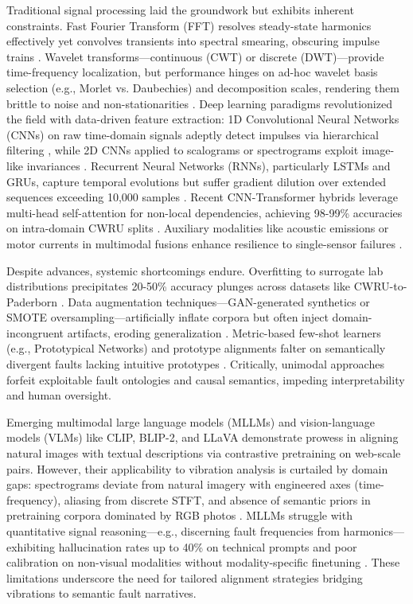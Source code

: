 Traditional signal processing laid the groundwork but exhibits inherent constraints. Fast Fourier Transform (FFT) resolves steady-state harmonics effectively yet convolves transients into spectral smearing, obscuring impulse trains \cite{cite10}. Wavelet transforms—continuous (CWT) or discrete (DWT)—provide time-frequency localization, but performance hinges on ad-hoc wavelet basis selection (e.g., Morlet vs. Daubechies) and decomposition scales, rendering them brittle to noise and non-stationarities \cite{cite11}. Deep learning paradigms revolutionized the field with data-driven feature extraction: 1D Convolutional Neural Networks (CNNs) on raw time-domain signals adeptly detect impulses via hierarchical filtering \cite{cite12}, while 2D CNNs applied to scalograms or spectrograms exploit image-like invariances \cite{cite13}. Recurrent Neural Networks (RNNs), particularly LSTMs and GRUs, capture temporal evolutions but suffer gradient dilution over extended sequences exceeding 10,000 samples \cite{cite14}. Recent CNN-Transformer hybrids leverage multi-head self-attention for non-local dependencies, achieving 98-99\% accuracies on intra-domain CWRU splits \cite{cite15}. Auxiliary modalities like acoustic emissions or motor currents in multimodal fusions enhance resilience to single-sensor failures \cite{cite16}.

Despite advances, systemic shortcomings endure. Overfitting to surrogate lab distributions precipitates 20-50\% accuracy plunges across datasets like CWRU-to-Paderborn \cite{cite17}. Data augmentation techniques—GAN-generated synthetics or SMOTE oversampling—artificially inflate corpora but often inject domain-incongruent artifacts, eroding generalization \cite{cite18}. Metric-based few-shot learners (e.g., Prototypical Networks) and prototype alignments falter on semantically divergent faults lacking intuitive prototypes \cite{cite19}. Critically, unimodal approaches forfeit exploitable fault ontologies and causal semantics, impeding interpretability and human oversight.

Emerging multimodal large language models (MLLMs) and vision-language models (VLMs) like CLIP, BLIP-2, and LLaVA demonstrate prowess in aligning natural images with textual descriptions via contrastive pretraining on web-scale pairs. However, their applicability to vibration analysis is curtailed by domain gaps: spectrograms deviate from natural imagery with engineered axes (time-frequency), aliasing from discrete STFT, and absence of semantic priors in pretraining corpora dominated by RGB photos \cite{cite27}\cite{cite28}. MLLMs struggle with quantitative signal reasoning—e.g., discerning fault frequencies from harmonics—exhibiting hallucination rates up to 40\% on technical prompts and poor calibration on non-visual modalities without modality-specific finetuning \cite{cite29}. These limitations underscore the need for tailored alignment strategies bridging vibrations to semantic fault narratives.


